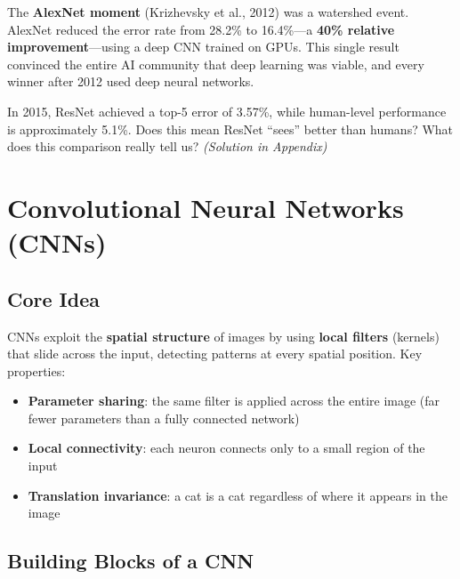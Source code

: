 \documentclass[11pt,a4paper]{article}
\begin{document}
\begin{tcolorbox}[warnbox={Turning Point: 2012}]
The \textbf{AlexNet moment} (Krizhevsky et al., 2012) was a watershed event. AlexNet reduced the error rate from 28.2\% to 16.4\%---a \textbf{40\% relative improvement}---using a deep CNN trained on GPUs. This single result convinced the entire AI community that deep learning was viable, and every winner after 2012 used deep neural networks.
\end{tcolorbox}

\begin{tcolorbox}[questionbox={Self-Check Q2}]
In 2015, ResNet achieved a top-5 error of 3.57\%, while human-level performance is approximately 5.1\%. Does this mean ResNet ``sees'' better than humans? What does this comparison really tell us? \textit{(Solution in Appendix)}
\end{tcolorbox}

\section{Convolutional Neural Networks (CNNs)}

\subsection{Core Idea}

CNNs exploit the \textbf{spatial structure} of images by using \textbf{local filters} (kernels) that slide across the input, detecting patterns at every spatial position. Key properties:

\begin{itemize}[leftmargin=1.5em]
    \item \textbf{Parameter sharing}: the same filter is applied across the entire image (far fewer parameters than a fully connected network)
    \item \textbf{Local connectivity}: each neuron connects only to a small region of the input
    \item \textbf{Translation invariance}: a cat is a cat regardless of where it appears in the image
\end{itemize}

\subsection{Building Blocks of a CNN}
\end{document}

